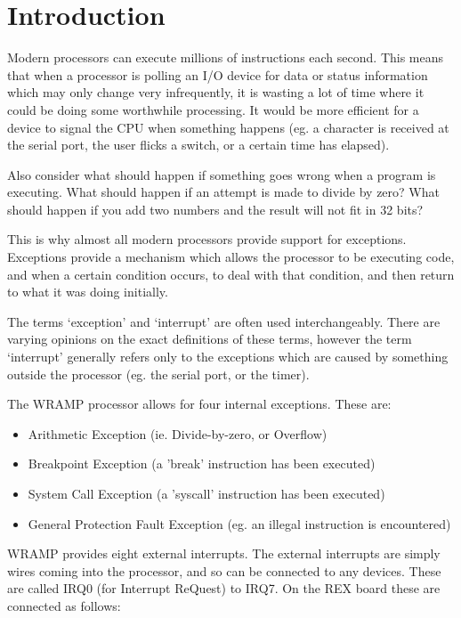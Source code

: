 \section{Introduction}

Modern processors can execute millions of instructions each
second. This means that when a processor is polling an I/O device for
data or status information which may only change very infrequently, it
is wasting a lot of time where it could be doing some worthwhile
processing.  It would be more efficient for a device to signal the CPU
when something happens (eg. a character is received at the serial
port, the user flicks a switch, or a certain time has elapsed).

Also consider what should happen if something goes wrong when a
program is executing. What should happen if an attempt is made to
divide by zero? What should happen if you add two numbers and the
result will not fit in 32 bits?

This is why almost all modern processors provide support for
exceptions. Exceptions provide a mechanism which allows the processor
to be executing code, and when a certain condition occurs, to deal
with that condition, and then return to what it was doing initially.

The terms `exception' and `interrupt' are often used
interchangeably. There are varying opinions on the exact definitions of
these terms, however the term `interrupt' generally refers only to the
exceptions which are caused by something outside the processor
(eg. the serial port, or the timer).

The WRAMP processor allows for four internal exceptions. These are:

\begin{itemize}
\item Arithmetic Exception (ie. Divide-by-zero, or Overflow)
\item Breakpoint Exception (a 'break' instruction has been executed)
\item System Call Exception (a 'syscall' instruction has been
executed)
\item General Protection Fault Exception (eg. an illegal instruction
is encountered)
\end{itemize}

WRAMP provides eight external interrupts. The external interrupts are 
simply wires coming into the processor, and so can be connected to any 
devices.  These are called IRQ0 (for Interrupt ReQuest) to IRQ7. On the 
REX board these are connected as follows:

